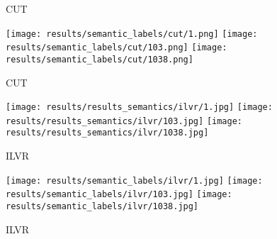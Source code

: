 \begin{figure*}[t!]
\begin{subfigure}[t]{0.105\linewidth}
      \caption{CUT}
    \end{subfigure}
    \begin{subfigure}[t]{0.105\linewidth}
      \captionsetup{justification=centering, labelformat=empty, font=scriptsize}
      \texttt{[image: results/semantic\_labels/cut/1.png]}
      \texttt{[image: results/semantic\_labels/cut/103.png]}
      \texttt{[image: results/semantic\_labels/cut/1038.png]}

      \caption{CUT}
    \end{subfigure}
    \begin{subfigure}[t]{0.105\linewidth}
      \captionsetup{justification=centering, labelformat=empty, font=scriptsize}
   
      \texttt{[image: results/results\_semantics/ilvr/1.jpg]}
      \texttt{[image: results/results\_semantics/ilvr/103.jpg]}
      \texttt{[image: results/results\_semantics/ilvr/1038.jpg]}
      \caption{ILVR}
    \end{subfigure}
    \begin{subfigure}[t]{0.105\linewidth}
      \captionsetup{justification=centering, labelformat=empty, font=scriptsize}
   
      \texttt{[image: results/semantic\_labels/ilvr/1.jpg]}
      \texttt{[image: results/semantic\_labels/ilvr/103.jpg]}
      \texttt{[image: results/semantic\_labels/ilvr/1038.jpg]}
      \caption{ILVR}
    \end{subfigure}
        \begin{subfigure}[t]{0.105\linewidth}
      \captionsetup{justification=centering, labelformat=empty, font=scriptsize}
   

\end{subfigure}
\end{figure*}
